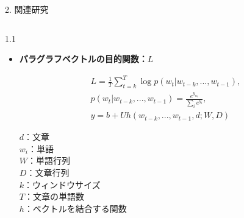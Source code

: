 \documentclass[unicode,10pt]{beamer}
\newlength{\mycolumnwidth}
\newcommand{\itemtitle}[1]{\textbf{#1}\\}
\newcommand{\doublecolumns}[4]{
    \begin{minipage}[t]{#1}
      #2
    \end{minipage}
    \begin{minipage}[t]{#3}
      #4
    \end{minipage}}
\begin{document}
\begin{frame}
\begin{block}{2. 関連研究}
\begin{columns}[onlytextwidth,t]
    \begin{column}{1.1\mycolumnwidth}
      \begin{itemize}
        \item \itemtitle{パラグラフベクトルの目的関数：$L$}
          \doublecolumns{0.575\linewidth}{
            \vspace{-1.5em} %
            \begin{gather*}
              L = \frac{1}{T} \sum^{T}_{t = k}
                  \log p(w_t | w_{t-k}, ..., w_{t-1}),
                \label{eq:ParagraphVector} \\
              p(w_t | w_{t-k}, ..., w_{t-1})
                = \frac{e^{y_{w_t}}}{\sum_i e^{y_i}},
                \nonumber \\
              y = b + Uh(w_{t-k}, ..., w_{t-1}, d; W, D) \nonumber
            \end{gather*}
          }{0.4\linewidth}{
            $d$：文章 \\
            $w_i$：単語 \\
            $W$：単語行列 \\
            $D$：文章行列 \\
            $k$：ウィンドウサイズ \\
            $T$：文章の単語数 \\
            $h$：ベクトルを結合する関数
          }
      \end{itemize}
    \end{column}
  \end{columns}
\end{block}


\end{frame}
\end{document}
